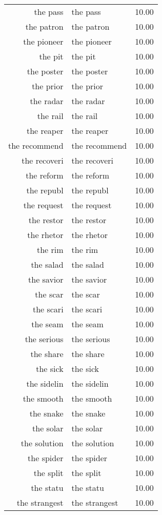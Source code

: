\begin{table}[ht]
\begin{tabular}{rlr}
  the pass & the pass & 10.00 \\ 
  the patron & the patron & 10.00 \\ 
  the pioneer & the pioneer & 10.00 \\ 
  the pit & the pit & 10.00 \\ 
  the poster & the poster & 10.00 \\ 
  the prior & the prior & 10.00 \\ 
  the radar & the radar & 10.00 \\ 
  the rail & the rail & 10.00 \\ 
  the reaper & the reaper & 10.00 \\ 
  the recommend & the recommend & 10.00 \\ 
  the recoveri & the recoveri & 10.00 \\ 
  the reform & the reform & 10.00 \\ 
  the republ & the republ & 10.00 \\ 
  the request & the request & 10.00 \\ 
  the restor & the restor & 10.00 \\ 
  the rhetor & the rhetor & 10.00 \\ 
  the rim & the rim & 10.00 \\ 
  the salad & the salad & 10.00 \\ 
  the savior & the savior & 10.00 \\ 
  the scar & the scar & 10.00 \\ 
  the scari & the scari & 10.00 \\ 
  the seam & the seam & 10.00 \\ 
  the serious & the serious & 10.00 \\ 
  the share & the share & 10.00 \\ 
  the sick & the sick & 10.00 \\ 
  the sidelin & the sidelin & 10.00 \\ 
  the smooth & the smooth & 10.00 \\ 
  the snake & the snake & 10.00 \\ 
  the solar & the solar & 10.00 \\ 
  the solution & the solution & 10.00 \\ 
  the spider & the spider & 10.00 \\ 
  the split & the split & 10.00 \\ 
  the statu & the statu & 10.00 \\ 
  the strangest & the strangest & 10.00 \\ 

\end{tabular}
\end{table}
